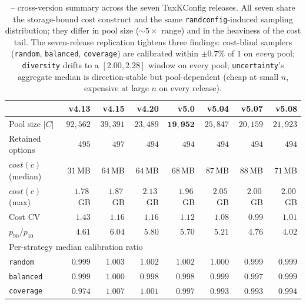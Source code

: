 \begin{table}[t]
\centering
\caption{\StudyLinux -- cross-version summary across the seven
TuxKConfig releases. All seven share the storage-bound cost construct
and the same \texttt{randconfig}-induced sampling distribution; they
differ in pool size ($\sim\!\!5\!\times$ range) and in the heaviness
of the cost tail. The seven-release replication tightens three
findings: cost-blind samplers (\texttt{random}, \texttt{balanced},
\texttt{coverage}) are calibrated within $\pm\!0.7\%$ of $1$ on
\emph{every} pool; \texttt{diversity} drifts to a $[2.00, 2.28]$
window on every pool; \texttt{uncertainty}'s aggregate median is
direction-stable but pool-dependent (cheap at small $n$, expensive
at large $n$ on every release).}
\label{tab:linux-summary}
\footnotesize
\setlength{\tabcolsep}{4.5pt}
\begin{tabular}{l r r r r r r r}
\toprule
                              & v4.13       & v4.15       & v4.20       & v5.0        & v5.04       & v5.07       & v5.08       \\
\midrule
Pool size $|C|$               & $92{,}562$  & $39{,}391$  & $23{,}489$  & $\mathbf{19{,}952}$ & $25{,}847$  & $20{,}159$  & $21{,}923$  \\
Retained options              & $495$       & $497$       & $494$       & $494$       & $494$       & $494$       & $494$       \\
$\mathit{cost}(c)$ (median)   & $31$\,MB    & $64$\,MB    & $64$\,MB    & $68$\,MB    & $87$\,MB    & $88$\,MB    & $71$\,MB    \\
$\mathit{cost}(c)$ (max)      & $1.78$\,GB  & $1.87$\,GB  & $\mathbf{2.13}$\,GB & $1.96$\,GB & $2.05$\,GB & $2.00$\,GB  & $2.00$\,GB  \\
Cost CV                       & $\mathbf{1.43}$ & $1.16$  & $1.16$      & $1.12$      & $1.08$      & $\mathbf{0.99}$ & $1.01$  \\
$p_{90}/p_{10}$               & $4.61$      & $\mathbf{6.04}$ & $5.80$ & $5.70$      & $5.21$      & $4.76$      & $4.02$      \\
\midrule
\multicolumn{8}{l}{Per-strategy median calibration ratio} \\
\midrule
\texttt{random}               & $0.999$     & $1.003$     & $1.002$     & $1.002$     & $1.000$     & $0.999$     & $0.999$     \\
\texttt{balanced}             & $0.999$     & $1.000$     & $0.998$     & $0.998$     & $0.999$     & $0.997$     & $0.999$     \\
\texttt{coverage}             & $0.974$     & $1.007$     & $1.001$     & $0.997$     & $0.993$     & $0.993$     & $0.994$     \\

\end{tabular}
\end{table}
